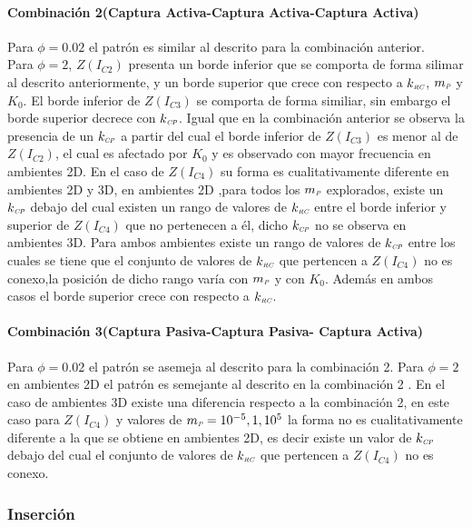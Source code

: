 \paragraph*{Combinaci\'on 2(Captura Activa-Captura Activa-Captura Activa)}
Para $\phi  = 0.02$ el patr\'on es similar al descrito para la combinaci\'on anterior. \\
Para $\phi = 2$, $Z(I_{C2})$ presenta un borde inferior que se comporta de forma silimar al descrito anteriormente, y un borde superior que crece con respecto a $k_{\textit{\tiny RC}}$, $m_{\textit{\tiny P}}$ y $K_0$. El borde inferior de $Z(I_{C3})$ se comporta de forma similiar, sin embargo el borde superior decrece con $k_{\textit{\tiny CP}}$. Igual que en la combinaci\'on anterior se observa la presencia de un $k_{\textit{\tiny CP}}$ a partir del cual el borde inferior de $Z(I_{C3})$ es menor al de $Z(I_{C2})$, el cual es afectado por $K_0$ y es observado con mayor frecuencia en ambientes 2D. En el caso de $Z(I_{C4})$ su forma es cualitativamente diferente en ambientes 2D y 3D, en ambientes 2D ,para todos los $m_{\textit{\tiny P}}$ explorados, existe un $k_{\textit{\tiny CP}}$ debajo del cual existen un rango de valores de $k_{\textit{\tiny RC}}$ entre el borde inferior y superior de $Z(I_{C4})$ que no pertenecen a \'el, dicho $k_{\textit{\tiny CP}}$ no se observa en ambientes 3D. Para ambos ambientes existe un rango de valores de $k_{\textit{\tiny CP}}$ entre los cuales se tiene que el conjunto de valores de $k_{\textit{\tiny RC}}$ que pertencen a $Z(I_{C4})$ no es conexo,la posici\'on de dicho rango var\'ia con $m_{\textit{\tiny P}}$ y con $K_0$. Adem\'as en ambos casos el borde superior crece con respecto a $k_{\textit{\tiny RC}}$.

\paragraph*{Combinaci\'on 3(Captura Pasiva-Captura Pasiva- Captura Activa)}
Para $\phi = 0.02$ el patr\'on se asemeja al descrito para la combinaci\'on 2.
Para $\phi = 2$ en ambientes 2D el patr\'on es semejante al descrito en la combinaci\'on 2 . En el caso de ambientes 3D existe una diferencia respecto a la combinaci\'on 2, en este caso para $Z(I_{C4})$ y valores de $m_{\textit{\tiny P}} = 10^{-5},1,10^{5}$ la forma no es cualitativamente diferente a la que se obtiene en ambientes 2D, es decir existe un valor de $k_{\textit{\tiny CP}}$ debajo del cual el conjunto de valores de $k_{\textit{\tiny RC}}$ que pertencen a $Z(I_{C4})$ no es conexo.


\subsubsection{Inserci\'on}


